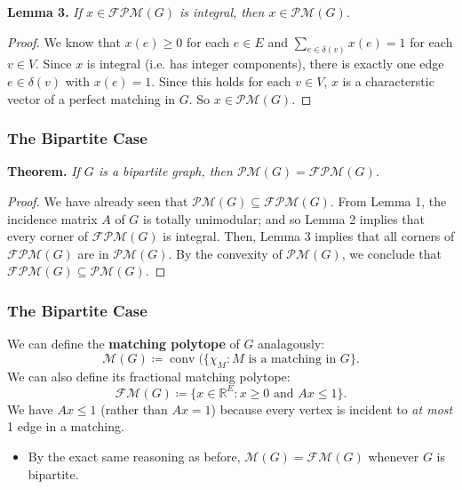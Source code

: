 \begin{frame}
\textbf{Lemma 3.} \emph{If \( x \in \mathcal{FPM} (G) \) is integral, then \( x \in \mathcal{PM} (G) \).}\pause
\begin{proof}
We know that \( x(e) \geq 0 \) for each \( e \in E \) and \( \sum_{e \in \delta (v)}^{} x(e) = 1 \) for each \( v \in V \). \pause Since \( x \) is integral (i.e. has integer components), there is exactly one edge \( e \in \delta (v) \) with \( x(e) = 1 \). \pause Since this holds for each \( v \in V \), \( x \) is a characterstic vector of a perfect matching in \( G \). \pause So \( x \in \mathcal{PM} (G) \).
\end{proof}
\end{frame}

\begin{frame}
	\frametitle{The Bipartite Case}
	\textbf{Theorem.} \emph{If \( G \) is a bipartite graph, then \( \mathcal{PM} (G) = \mathcal{FPM} (G) \).}\pause
\begin{proof}
We have already seen that \( \mathcal{PM} (G) \subseteq \mathcal{FPM} (G) \). \pause From Lemma 1, the incidence matrix \( A \) of \( G \) is totally unimodular; \pause and so Lemma 2 implies that every corner of \( \mathcal{FPM} (G) \) is integral. \pause Then, Lemma 3 implies that all corners of \( \mathcal{FPM} (G) \) are in \( \mathcal{PM} (G) \). \pause By the convexity of \( \mathcal{PM} (G) \), we conclude that \( \mathcal{FPM} (G) \subseteq \mathcal{PM} (G) \).
\end{proof}
\end{frame}

\begin{frame}
	\frametitle{The Bipartite Case}
We can define the \textbf{matching polytope} of \( G \) analagously: \[ \mathcal{M} (G) \coloneqq \operatorname{conv} (\{ \chi_{M} : M \mbox{ is a matching in } G \} . \] \pause We can also define its fractional matching polytope: \[ \mathcal{FM} (G) \coloneqq \{ x \in \mathbb{R}^{E} : x \geq 0 \mbox{ and } Ax \leq 1 \}. \]
\pause We have \( Ax \leq 1 \) (rather than \( Ax = 1 \)) because every vertex is incident to \emph{at most} 1 edge in a matching.
\begin{itemize}
	\item<2> By the exact same reasoning as before, \( \mathcal{M} (G) = \mathcal{FM} (G) \) whenever \( G \) is bipartite.
	
\end{itemize}
\end{frame}

